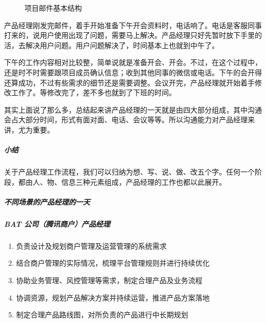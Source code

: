 \documentclass[letterpaper,11pt,english]{sphinxmanual}
\begin{document}
\begin{figure}[H]
\centering
\capstart

\noindent{}
\caption{项目邮件基本结构\sphinxfootnotemark[616]}\label{\detokenize{chapter_experience/1Day:id8}}\end{figure}
%
\begin{footnotetext}[616]\sphinxAtStartFootnote
{}
%
\end{footnotetext}\ignorespaces 
产品经理刚发完邮件，着手开始准备下午开会资料时，电话响了。电话是客服同事打来的，说用户使用出现了问题，需要马上解决。产品经理只好先暂时放下手里的活，去解决用户问题。用户问题解决了，时间基本上也就到中午了。

下午的工作内容相对比较整，简单说就是准备开会、开会。不过，在这个过程中，还是时不时需要跟项目成员确认信息；收到其他同事的微信或电话。下午的会开得还算成功，不过有些需求的细节还是需要调整。会议开完，产品经理就开始着手修改工作了。等修改完了，差不多也就到了下班的时间。

其实上面说了那么多，总结起来讲产品经理的一天就是由四大部分组成，其中沟通会占大部分时间，形式有面对面、电话、会议等等。所以沟通能力对产品经理来讲，尤为重要。


\subparagraph{小结}
\label{\detokenize{chapter_experience/1Day:id4}}
关于产品经理工作流程，我们可以归纳为想、写、说、做、改五个字。任何一个阶段，都由人、物、信息三种元素组成，产品经理的工作也都以此展开。


\subparagraph{不同场景的产品经理的一天}
\label{\detokenize{chapter_experience/1Day:id5}}

\subparagraph{BAT 公司（腾讯商户）产品经理}
\label{\detokenize{chapter_experience/1Day:bat}}\begin{enumerate}
%
\item {} 
负责设计及规划商户管理及运营管理的系统需求

\item {} 
结合商户管理的实际情况，梳理平台管理规则并进行持续优化

\item {} 
协助业务管理、风控管理等需求，制定合理产品及业务流程

\item {} 
协调资源，规划产品解决方案并持续运营，推进产品方案落地

\item {} 
制定合理产品路线图，对所负责的产品进行中长期规划

\end{enumerate}
\end{document}
